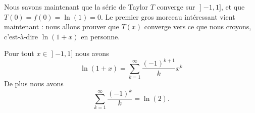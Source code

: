 Nous savons maintenant que la série de Taylor \( T\) converge sur \( \mathopen] -1 , 1 \mathclose]\), et que \( T(0)=f(0)=\ln(1)=0\). Le premier gros morceau intéressant vient maintenant : nous allons prouver que \( T(x)\) converge vers ce que nous croyons, c'est-à-dire \( \ln(1+x)\) en personne.

\begin{proposition}     \label{PROPooKPBIooJdNsqX}
Pour tout \( x\in\mathopen] -1 , 1 \mathclose]\) nous avons
    \begin{equation}        \label{EqweEZnV}
        \ln(1+x)=\sum_{k=1}^{\infty}\frac{ (-1)^{k+1} }{ k }x^k
    \end{equation}
    De plus nous avons
    \begin{equation}    \label{EqKUQmOZ}
        \sum_{k=1}^{\infty}\frac{ (-1)^k }{ k }=\ln(2).
    \end{equation}
\end{proposition}

